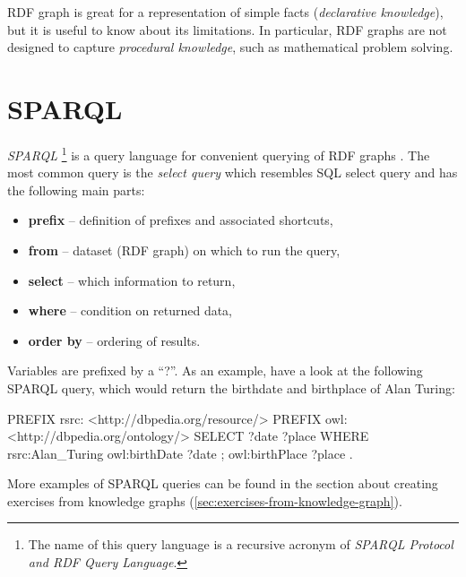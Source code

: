 \documentclass[12pt, twoside]{fithesis2}
\renewcommand{\_}{\leavevmode \kern0.07em\vbox{\hrule width0.4em}}
\newcommand{\squarebullet}{\textcolor{black}{\raisebox{0.15em}{\rule{4pt}{4pt}}}}
\newcommand{\emptysquarebullet}{\textcolor{black}{\raisebox{0.10em}{\tiny$\square$}}}
\newenvironment{myItemize}{
  \begin{itemize}[leftmargin=2em,rightmargin=1em,itemsep=\parskip ,parsep=0em,topsep=0em,partopsep=0em]
  \renewcommand{\labelitemi}{\squarebullet}
  \renewcommand{\labelitemii}{\textbullet}
}{
  \end{itemize}
}
\begin{document}
RDF graph is great for a representation of simple facts (\emph{declarative knowledge}),
but it is useful to know about its limitations.
In particular, RDF graphs are not designed to capture \textit{procedural knowledge}, such as mathematical problem solving.



\section{SPARQL}
\label{sec:sparql}

\textit{SPARQL}%
\footnote{The name of this query language is a recursive acronym of \textit{SPARQL Protocol and RDF Query Language}.}
is a query language for convenient querying of RDF graphs \parencite[][84]{semantic-web}.
The most common query is the \textit{select query} which resembles SQL select query and has the following main parts:
\begin{myItemize}
  \item \textbf{prefix} -- definition of prefixes and associated shortcuts,
  \item \textbf{from} -- dataset (RDF graph) on which to run the query,
  \item \textbf{select} -- which information to return,
  \item \textbf{where} -- condition on returned data,
  \item \textbf{order by} -- ordering of results.
\end{myItemize}
Variables are prefixed by a ``?''. As an example, have a look at the following SPARQL query, which would return the birthdate and birthplace of Alan Turing:
\begin{code}
PREFIX rsrc: <http://dbpedia.org/resource/>
PREFIX owl: <http://dbpedia.org/ontology/>
SELECT ?date ?place
WHERE {
  rsrc:Alan_Turing owl:birthDate ?date ;
                     owl:birthPlace ?place .
}
\end{code}

More examples of SPARQL queries can be found in the section about creating exercises from knowledge graphs
(\autoref{sec:exercises-from-knowledge-graph}).

\end{document}
